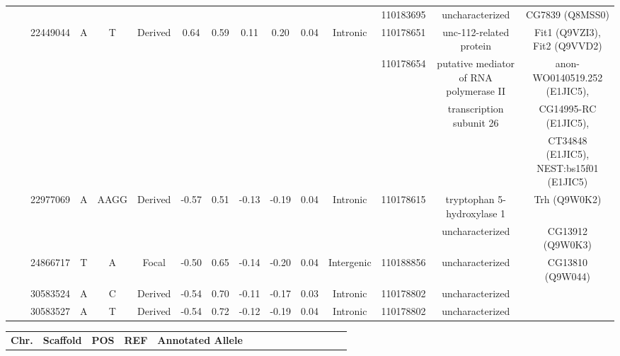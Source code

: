 \begin{landscape}
\begin{table}[!htp]
\begin{center}
\begin{tabular}{ccS[table-format=8.0]cccS[table-format=1.2]S[table-format=1.2]S[table-format=1.2]S[table-format=1.2]S[table-format=1.2]cccc}
 &  &  &  &  &  &  &  &  &  &  &  & 110183695 & uncharacterized & CG7839 (Q8MSS0)\\
 &  & 22449044 & A & T & Derived & 0.64 & 0.59 & 0.11 & 0.20 & 0.04 & Intronic & 110178651 & unc-112-related protein & Fit1 (Q9VZI3), Fit2 (Q9VVD2)\\
 &  &  &  &  &  &  &  &  &  &  &  & 110178654 & putative mediator of RNA polymerase II  & anon-WO0140519.252 (E1JIC5),  \\
 &  &  &  &  &  &  &  &  &  &  &  &  & transcription subunit 26& CG14995-RC (E1JIC5),\\
 &  &  &  &  &  &  &  &  &  &  &  &  & & CT34848 (E1JIC5), NEST:bs15f01 (E1JIC5)\\
 &  & 22977069 & A & AAGG & Derived & -0.57 & 0.51 & -0.13 & -0.19 & 0.04 & Intronic & 110178615 & tryptophan 5-hydroxylase 1 & Trh (Q9W0K2)\\
 &  &  &  &  &  &  &  &  &  &  &  &  & uncharacterized & CG13912 (Q9W0K3)\\
 &  & 24866717 & T & A & Focal & -0.50 & 0.65 & -0.14 & -0.20 & 0.04 & Intergenic & 110188856 & uncharacterized & CG13810 (Q9W044)\\
 &    & 30583524 & A & C & Derived & -0.54 & 0.70 & -0.11 & -0.17 & 0.03 & Intronic & 110178802 & uncharacterized & \\
 &   & 30583527 & A & T & Derived & -0.54 & 0.72 & -0.12 & -0.19 & 0.04 & Intronic & 110178802 & uncharacterized & \\
 \bottomrule
\end{tabular}
\end{center}
\end{table}
\newpage
\begin{table}[!htp]
\renewcommand{\arraystretch}{1.1}
\begin{center}
    \tiny
\begin{tabular}{ccS[table-format=8.0]cccS[table-format=1.2]S[table-format=1.2]S[table-format=1.2]S[table-format=1.2]S[table-format=1.2]cccc}
\toprule
\textbf{Chr.} & \textbf{Scaffold} & \textbf{POS} & \textbf{REF} & \textbf{Annotated Allele} &

\end{tabular}
\end{center}
\end{table}
\end{landscape}
